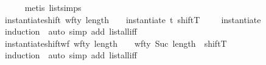 \begin{isabellebody}
\ \ \ \ \isamarkupfalse%
\ {\isacharparenleft}{\kern0pt}metis\ list{\isachardot}{\kern0pt}simps{\isacharparenleft}{\kern0pt}{}{\isacharparenright}{\kern0pt}{\isacharparenright}{\kern0pt}\isanewline
{}\isamarkupfalse%
%
\endisatagproof
{\isafoldproof}%
%
\isadelimproof
\isanewline
%
\endisadelimproof
\isanewline
{}\isamarkupfalse%
\isanewline
\isanewline
\isanewline
{}\isamarkupfalse%
\ instantiate{\isacharunderscore}{\kern0pt}shift{\isacharcolon}{\kern0pt}\ {\isachardoublequoteopen}wf{\isacharunderscore}{\kern0pt}ty\ {\isacharparenleft}{\kern0pt}length\ {\isasymOmega}{\isacharparenright}{\kern0pt}\ {\isasymtau}\ {\isasymLongrightarrow}\ instantiate\ {\isacharparenleft}{\kern0pt}t{\isacharhash}{\kern0pt}{\isasymOmega}{\isacharparenright}{\kern0pt}\ {\isacharparenleft}{\kern0pt}shiftT\ {}\ {}\ {\isasymtau}{\isacharparenright}{\kern0pt}\ {\isacharequal}{\kern0pt}\ instantiate\ {\isasymOmega}\ {\isasymtau}{\isachardoublequoteclose}\isanewline
%
\isadelimproof
\ \ %
\endisadelimproof
%
\isatagproof
{}\isamarkupfalse%
\ {\isacharparenleft}{\kern0pt}induction\ {\isasymtau}{\isacharparenright}{\kern0pt}\ {\isacharparenleft}{\kern0pt}auto\ simp\ add{\isacharcolon}{\kern0pt}\ list{\isacharunderscore}{\kern0pt}all{\isacharunderscore}{\kern0pt}iff{\isacharparenright}{\kern0pt}%
\endisatagproof
{\isafoldproof}%
%
\isadelimproof
\isanewline
%
\endisadelimproof
\ \ \isanewline
{}\isamarkupfalse%
\ instantiate{\isacharunderscore}{\kern0pt}shift{\isacharunderscore}{\kern0pt}wf{\isacharcolon}{\kern0pt}\ {\isachardoublequoteopen}wf{\isacharunderscore}{\kern0pt}ty\ {\isacharparenleft}{\kern0pt}length\ {\isasymOmega}{\isacharparenright}{\kern0pt}\ {\isasymtau}\ {\isasymLongrightarrow}\ wf{\isacharunderscore}{\kern0pt}ty\ {\isacharparenleft}{\kern0pt}Suc\ {\isacharparenleft}{\kern0pt}length\ {\isasymOmega}{\isacharparenright}{\kern0pt}{\isacharparenright}{\kern0pt}\ {\isacharparenleft}{\kern0pt}shiftT\ {}\ {}\ {\isasymtau}{\isacharparenright}{\kern0pt}{\isachardoublequoteclose}\isanewline
%
\isadelimproof
\ \ %
\endisadelimproof
%
\isatagproof
{}\isamarkupfalse%
\ {\isacharparenleft}{\kern0pt}induction\ {\isasymtau}{\isacharparenright}{\kern0pt}\ {\isacharparenleft}{\kern0pt}auto\ simp\ add{\isacharcolon}{\kern0pt}\ list{\isacharunderscore}{\kern0pt}all{\isacharunderscore}{\kern0pt}iff{\isacharparenright}{\kern0pt}%
\endisatagproof
{\isafoldproof}%
%
\isadelimproof
\isanewline
%
\endisadelimproof

\end{isabellebody}
